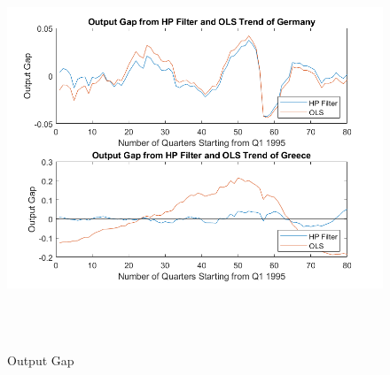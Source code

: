 \documentclass[12pt]{report}
\begin{document}
\begin{figure}[h]
\includegraphics[height=12cm, width=\textwidth]{fig2_2}
\caption{Output Gap}
\end{figure}
\end{document}
